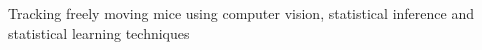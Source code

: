
Tracking freely moving mice using computer vision, statistical inference and
statistical learning techniques
